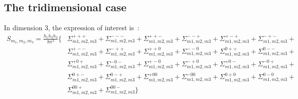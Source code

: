 \subsection{The tridimensional case}
In dimension 3, the expression of interest is~:
\begin{align*}
S_{m_1,m_2,m_3}=\frac{h_1h_2h_3}{8\pi^3}\Big\{
 &   \Sigma_{m1,m2,m3}^{+++} + \Sigma_{m1,m2,m3}^{---} +
     \Sigma_{m1,m2,m3}^{++-} + \Sigma_{m1,m2,m3}^{--+} +
     \Sigma_{m1,m2,m3}^{+-+} + \Sigma_{m1,m2,m3}^{-+-} + \\
 &   \Sigma_{m1,m2,m3}^{+--} + \Sigma_{m1,m2,m3}^{-++} +
     \Sigma_{m1,m2,m3}^{++0} + \Sigma_{m1,m2,m3}^{--0} +
     \Sigma_{m1,m2,m3}^{0++} + \Sigma_{m1,m2,m3}^{0--} + \\
 &   \Sigma_{m1,m2,m3}^{+0+} + \Sigma_{m1,m2,m3}^{-0-} +
     \Sigma_{m1,m2,m3}^{+-0} + \Sigma_{m1,m2,m3}^{-+0} +
     \Sigma_{m1,m2,m3}^{+0-} + \Sigma_{m1,m2,m3}^{-0+} + \\
 &   \Sigma_{m1,m2,m3}^{0+-} + \Sigma_{m1,m2,m3}^{0-+} +
     \Sigma_{m1,m2,m3}^{+00} + \Sigma_{m1,m2,m3}^{-00} +
     \Sigma_{m1,m2,m3}^{0+0} + \Sigma_{m1,m2,m3}^{0-0} + \\
 &   \Sigma_{m1,m2,m3}^{00+} + \Sigma_{m1,m2,m3}^{00-}
\Big\}
\end{align*}


